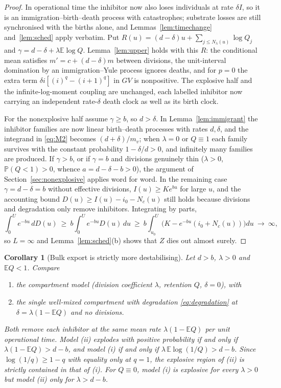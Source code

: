 \documentclass[11pt,a4paper]{article}
\numberwithin{equation}{section}
\newtheorem{corollary}[theorem]{Corollary}
\theoremstyle{definition}\newtheorem{definition}[theorem]{Definition}
\theoremstyle{remark}\newtheorem{remark}[theorem]{Remark}\newtheorem{example}[theorem]{Example}
\newcommand{\E}{\mathbb E}
\renewcommand{\P}{\mathbb P}
\begin{document}
\begin{proof}
In operational time the inhibitor now also loses individuals at rate $\delta I$, so it is an immigration--birth--death process with catastrophes; substrate losses are still synchronised with the births alone, and Lemmas~\ref{lem:timechange} and~\ref{lem:sched} apply verbatim. Put $R(u)=(d-\delta)u+\sum_{j\le N_\lambda(u)}\log Q_j$ and $\gamma=d-\delta+\lambda\E\log Q$. Lemma~\ref{lem:upper} holds with this $R$: the conditional mean satisfies $m'=c+(d-\delta)m$ between divisions, the unit-interval domination by an immigration--Yule process ignores deaths, and for $p=0$ the extra term $\delta i[(i)^q-(i+1)^q]$ in $GV$ is nonpositive. The explosive half and the infinite-log-moment coupling are unchanged, each labelled inhibitor now carrying an independent rate-$\delta$ death clock as well as its birth clock.

For the nonexplosive half assume $\gamma\ge b$, so $d>\delta$. In Lemma~\ref{lem:immigrant} the inhibitor families are now linear birth--death processes with rates $d,\delta$, and the integrand in \eqref{eq:M2} becomes $(d+\delta)/m_v$; when $\lambda=0$ or $Q\equiv1$ each family survives with the constant probability $1-\delta/d>0$, and infinitely many families are produced. If $\gamma>b$, or if $\gamma=b$ and divisions genuinely thin ($\lambda>0$, $\P(Q<1)>0$, whence $a=d-\delta-b>0$), the argument of Section~\ref{sec:nonexplosive} applies word for word. In the remaining case $\gamma=d-\delta=b$ without effective divisions, $I(u)\ge Ke^{bu}$ for large $u$, and the accounting bound $D(u)\ge I(u)-i_0-N_c(u)$ still holds because divisions and degradation only remove inhibitors. Integrating by parts,
\[
\int_0^Ue^{-bu}\,dD(u)\ \ge\ b\int_0^Ue^{-bu}D(u)\,du\ \ge\ b\int_{u_0}^U\bigl(K-e^{-bu}(i_0+N_c(u))\bigr)du\ \longrightarrow\ \infty,
\]
so $L=\infty$ and Lemma~\ref{lem:sched}(b) shows that $Z$ dies out almost surely.
\end{proof}

\begin{corollary}[Bulk export is strictly more destabilising]\label{cor:bulk}
Let $d>b$, $\lambda>0$ and $\E Q<1$. Compare
\begin{enumerate}[label=(\roman*)]
\item the compartment model (division coefficient $\lambda$, retention $Q$, $\delta=0$), with
\item the single well-mixed compartment with degradation \eqref{eq:degradation} at $\delta=\lambda(1-\E Q)$ and no divisions.
\end{enumerate}
Both remove each inhibitor at the same mean rate $\lambda(1-\E Q)$ per unit operational time. Model (ii) explodes with positive probability if and only if $\lambda(1-\E Q)>d-b$, and model (i) if and only if $\lambda\,\E\log(1/Q)>d-b$. Since $\log(1/q)\ge1-q$ with equality only at $q=1$, the explosive region of (ii) is strictly contained in that of (i). For $Q\equiv0$, model (i) is explosive for every $\lambda>0$ but model (ii) only for $\lambda>d-b$.
\end{corollary}
\end{document}
